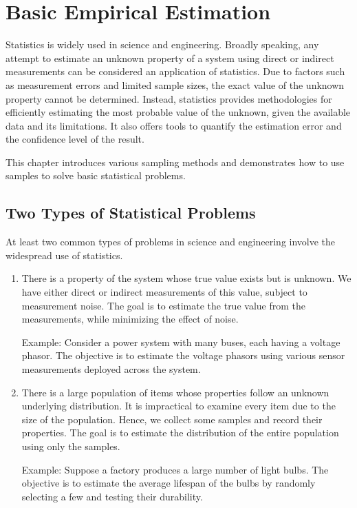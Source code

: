 \chapter{Basic Empirical Estimation} \label{ch:statisticsandsampling}

Statistics is widely used in science and engineering. Broadly speaking, any attempt to estimate an unknown property of a system using direct or indirect measurements can be considered an application of statistics. Due to factors such as measurement errors and limited sample sizes, the exact value of the unknown property cannot be determined. Instead, statistics provides methodologies for efficiently estimating the most probable value of the unknown, given the available data and its limitations. It also offers tools to quantify the estimation error and the confidence level of the result.

This chapter introduces various sampling methods and demonstrates how to use samples to solve basic statistical problems.

\section{Two Types of Statistical Problems}

At least two common types of problems in science and engineering involve the widespread use of statistics.

\begin{enumerate}
	\item There is a property of the system whose true value exists but is unknown. We have either direct or indirect measurements of this value, subject to measurement noise. The goal is to estimate the true value from the measurements, while minimizing the effect of noise.

Example: Consider a power system with many buses, each having a voltage phasor. The objective is to estimate the voltage phasors using various sensor measurements deployed across the system.

	\item There is a large population of items whose properties follow an unknown underlying distribution. It is impractical to examine every item due to the size of the population. Hence, we collect some samples and record their properties. The goal is to estimate the distribution of the entire population using only the samples.

Example: Suppose a factory produces a large number of light bulbs. The objective is to estimate the average lifespan of the bulbs by randomly selecting a few and testing their durability.

\end{enumerate}

